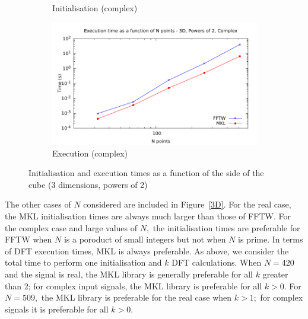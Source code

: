 \documentclass[12pt, a4paper]{article} \setlength{\textheight}{24cm}
\begin{document}
\begin{figure}[H]
\begin{subfigure}{.5\textwidth}
    \caption{Initialisation (complex)}
    \label{3DPOW2CI}
  \end{subfigure}%
  \begin{subfigure}{.5\textwidth}
    \centering
    \includegraphics[width=.9\linewidth]{graphs/3d-pow2-exec-c.pdf}
    \caption{Execution (complex)}
    \label{3DPOW2C}
  \end{subfigure}
  \caption{Initialisation and execution times as a function of the
    side of the cube (3 dimensions, powers of 2)}
  \label{3DPOW2}
\end{figure}

The other cases of $N$ considered are included in Figure~\ref{3D}. For
the real case, the MKL initialisation times are always much larger
than those of FFTW. For the complex case and large values of $N,$ the
initialisation times are preferable for FFTW when $N$ is a poroduct of
small integers but not when $N$ is prime. In terms of DFT execution
times, MKL is always preferable. As above, we consider the total time
to perform one initialisation and $k$ DFT calculations. When $N=420$
and the signal is real, the MKL library is generally preferable for
all $k$ greater than 2; for complex input signals, the MKL library is
preferable for all $k>0.$ For $N=509,$ the MKL library is preferable
for the real case when $k>1;$ for complex signals it is preferable for
all $k>0.$
\end{document}
